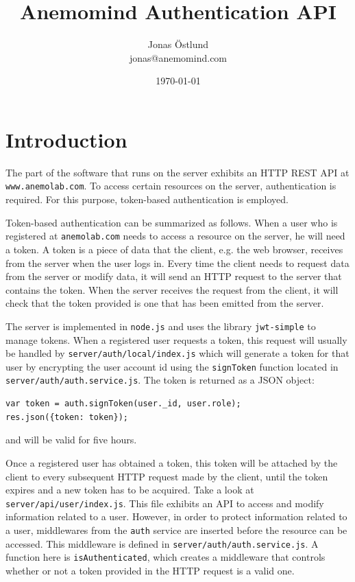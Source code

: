 \documentclass{article}
\author{Jonas Östlund\\jonas@anemomind.com}
\date{\today}
\title{Anemomind Authentication API}
\begin{document}
\maketitle
\section{Introduction}
The part of the software that runs on the server exhibits
an HTTP REST API at \texttt{www.anemolab.com}. To access certain resources
on the server, authentication is required. For this purpose, token-based
authentication is employed.

Token-based authentication can be summarized as follows. When a user who is registered at \texttt{anemolab.com} needs to access a resource on the server, he will need a token. A token is a piece of data that the client, e.g. the web browser, receives from the server when the user logs in. Every time the client needs to request data from the server or modify data, it will send an HTTP request to the server that contains the token. When the server receives the request from the client, it will check that the token provided is one that has been emitted from the server.

The server is implemented in \texttt{node.js} and uses the library \texttt{jwt-simple} to manage tokens. When a registered user requests a token, this request will usually be handled by \texttt{server/auth/local/index.js} which will generate a token for that user by encrypting the user account id using the \texttt{signToken} function located in \texttt{server/auth/auth.service.js}. The token is returned as a JSON object:
\begin{verbatim}
var token = auth.signToken(user._id, user.role);
res.json({token: token});
\end{verbatim}
and will be valid for five hours.

Once a registered user has obtained a token, this token will be attached by the client to every subsequent HTTP request made by the client, until the token expires and a new token has to be acquired. Take a look at \texttt{server/api/user/index.js}. This file exhibits an API to access and modify information related to a user. However, in order to protect information related to a user, middlewares from the \texttt{auth} service are inserted before the resource can be accessed. This middleware is defined in \texttt{server/auth/auth.service.js}. A function here is \texttt{isAuthenticated}, which creates a middleware that controls whether or not a token provided in the HTTP request is a valid one.
\end{document}
